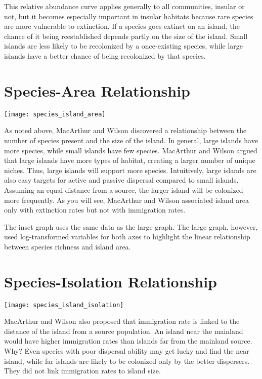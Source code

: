 \documentclass{tufte-handout}
\begin{document}
This relative abundance curve applies generally to all communities, insular or not, but it becomes especially important in insular habitats because rare species are more vulnerable to extinction.  If a species goes extinct on an island, the chance of it being reestablished depends partly on the size of the island.  Small islands are less likely to be recolonized by a once-existing species, while large islands have a better chance of being recolonized by that species.

\section{Species-Area Relationship}

\begin{marginfigure}%
	\centering
	\texttt{[image: species\_island\_area]}
\end{marginfigure} 

As noted above, MacArthur and Wilson discovered a relationship between the number of species present and the size of the island. In general, large islands have more species, while small islands have few species. MacArthur and Wilson argued that large islands have more types of habitat, creating a larger number of unique niches. Thus, large islands will support more species. Intuitively, large islands are also easy targets for active and passive dispersal compared to small islands. Assuming an equal distance from a source, the larger island will be colonized more frequently. As you will see, MacArthur and Wilson associated island area only with extinction rates but not with immigration rates.

The inset graph uses the same data as the large graph. The large graph, however, used log-transformed variables for both axes to highlight the linear relationship between species richness and island area.

\section{Species-Isolation Relationship}
\begin{marginfigure}%
	\centering
	\texttt{[image: species\_island\_isolation]}
\end{marginfigure} 

MacArthur and Wilson also proposed that immigration rate is linked to the distance of the island from a source population.  An island near the mainland would have higher immigration rates than islands far from the mainland source.   Why?  Even species with poor dispersal ability may get lucky and find the near island, while far islands are likely to be colonized only by the better dispersers. They did not link immigration rates to island size. 
\end{document}
